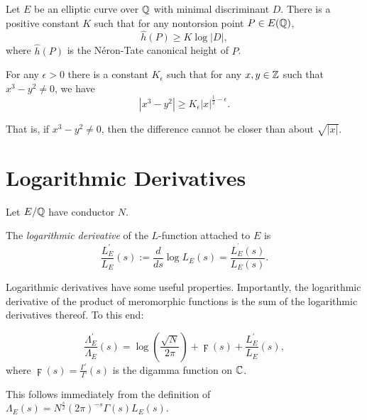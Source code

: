 \documentclass[10pt]{article}
\newcommand{\pr}{^{\prime}}
\newcommand{\Les}{L_E(s)}
\newcommand{\Lams}{\Lambda_E(s)}
\newcommand{\ldLes}{\frac{L_E\pr}{L_E}(s)}
\newcommand{\ldLe}[1]{\frac{L_E\pr}{L_E}\left(#1\right)}
\newcommand{\ldLam}[1]{\frac{\Lambda_E\pr}{\Lambda_E}\left(#1\right)}
\begin{document}
\begin{conjecture}[Lang]\label{conj:Lang}
Let $E$ be an elliptic curve over $\mathbb{Q}$ with minimal discriminant $D$. There is a positive constant $K$ such that for any nontorsion point $P\in E(\mathbb{Q})$,
\begin{equation}
\hat{h}(P) \ge K\log |D|,
\end{equation}
where $\hat{h}(P)$ is the N\'{e}ron-Tate canonical height of $P$.
\end{conjecture}

\begin{conjecture}[Hall]\label{conj:Hall}
For any $\epsilon > 0$ there is a constant $K_{\epsilon}$ such that for any $x,y \in \mathbb{Z}$ such that $x^3-y^2 \ne 0$, we have
\begin{equation}
|x^3-y^2| \ge K_{\epsilon} |x|^{\frac{1}{2}-\epsilon}.
\end{equation}
\end{conjecture}
That is, if $x^3-y^2 \ne 0$, then the difference cannot be closer than about $\sqrt{|x|}$.


\newpage
\section{Logarithmic Derivatives}\label{sec:log_derivs}

Let $E/\mathbb{Q}$  have conductor $N$.
\begin{definition}
The {\it logarithmic derivative} of the $L$-function attached to $E$ is
\begin{equation}
\ldLes := \frac{d}{ds} \log \Les = \frac{L_E^{\pr}(s)}{\Les}.
\end{equation}
\end{definition}
Logarithmic derivatives have some useful properties. Importantly, the logarithmic derivative of the product of meromorphic functions is the sum of the logarithmic derivatives thereof. To this end:
\begin{proposition}
\begin{equation}\label{eqn:logderiv_relation}
\ldLam{s} = \log\left(\frac{\sqrt{N}}{2\pi}\right) + \digamma(s) + \ldLe{s},
\end{equation}
where $\digamma(s) = \frac{\Gamma\pr}{\Gamma}(s)$ is the digamma function on $\mathbb{C}$.
\end{proposition}
This follows immediately from the definition of $\Lams = N^{\frac{s}{2}}(2\pi)^{-s}\Gamma(s)\Les$. \\
\end{document}
